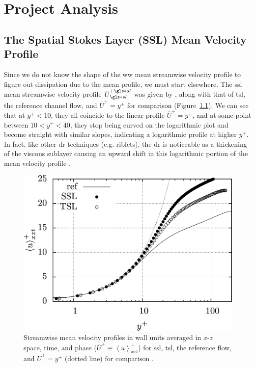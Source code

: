 \chapter{Project Analysis}\glsresetall
\section{The Spatial Stokes Layer (SSL) Mean Velocity Profile}\label{sec:sslmean}
Since we do not know the shape of the \gls{ww} mean streamwise velocity profile to figure out dissipation due to the mean profile, we must start elsewhere. The \gls{ssl} mean streamwise velocity profile $\overline{U}\ssl\ps$ was given by \vqt, along with that of \gls{tsl}, the reference channel flow, and $\overline{U}^{+}=y^{+}$ for comparison (Figure~\ref{fig:sslmeanprofile}). We can see that at $y^{+}<10$, they all coincide to the linear profile $\overline{U}^{+}=y^{+}$, and at some point between $10<y^{+}<40$, they stop being curved on the logarithmic plot and become straight with similar slopes, indicating a logarithmic profile at higher $y^{+}$. In fact, like other \gls{dr} techniques (e.g. riblets), the \gls{dr} is noticeable as a thickening of the viscous sublayer causing an upward shift in this logarithmic portion of the mean velocity profile \cite{viotti2009,choi1989,luchini1996}. 

\begin{figure}[htbp]
	\centering
	\includegraphics[width=0.5\linewidth]{project/fig/sslmeanprofile.png}
	\caption[Streamwise mean velocity profiles of SSL and reference flow]{Streamwise mean velocity profiles in wall units averaged in $x$-$z$ space, time, and phase ($\overline{U}^{+}\equiv \left<u \right>^{+}_{xzt}$) for \gls{ssl}, \gls{tsl}, the reference flow, and $\overline{U}^{+}=y^{+}$ (dotted line) for comparison \cite{viotti2009}.}
	\label{fig:sslmeanprofile}
\end{figure}

